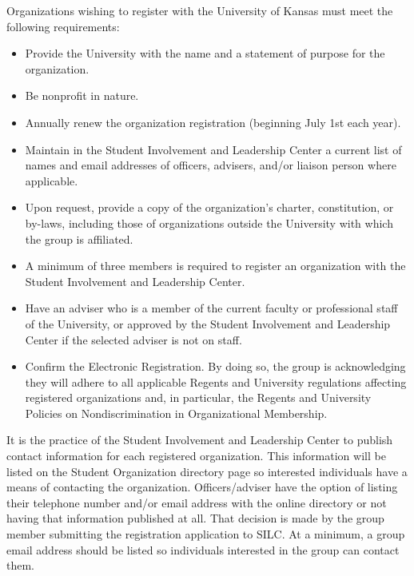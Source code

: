 Organizations wishing to register with the University of Kansas must meet the
following requirements:
\begin{itemize}
  \item Provide the University with the name and a statement of purpose for the
        organization.
  \item Be nonprofit in nature.
  \item Annually renew the organization registration (beginning July 1st each
        year).
  \item Maintain in the Student Involvement and Leadership Center a current list
        of names and email addresses of officers, advisers, and/or liaison
        person where applicable.
  \item Upon request, provide a copy of the organization's charter, constitution,
        or by-laws, including those of organizations outside the University with
        which the group is affiliated.
  \item A minimum of three members is required to register an organization with
        the Student Involvement and Leadership Center.
  \item Have an adviser who is a member of the current faculty or professional
        staff of the University, or approved by the Student Involvement and
        Leadership Center if the selected adviser is not on staff.
  \item Confirm the Electronic Registration. By doing so, the group is
        acknowledging they will adhere to all applicable Regents and University
        regulations affecting registered organizations and, in particular, the
        Regents and University Policies on Nondiscrimination in Organizational
        Membership.
\end{itemize}
It is the practice of the Student Involvement and Leadership Center to publish
contact information for each registered organization. This information will be
listed on the Student Organization directory page so interested individuals have
a means of contacting the organization. Officers/adviser have the option of
listing their telephone number and/or email address with the online directory or
not having that information published at all. That decision is made by the group
member submitting the registration application to SILC. At a minimum, a group
email address should be listed so individuals interested in the group can
contact them.

